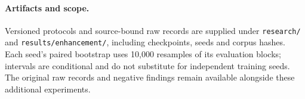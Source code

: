 \paragraph{Artifacts and scope.}
Versioned protocols and source-bound raw records are supplied under
\texttt{research/} and \texttt{results/enhancement/}, including checkpoints,
seeds and corpus hashes. Each seed's paired bootstrap uses 10,000
resamples of its evaluation blocks; intervals are conditional and do not
substitute for independent training seeds. The original raw records and negative findings remain available alongside
these additional experiments.
